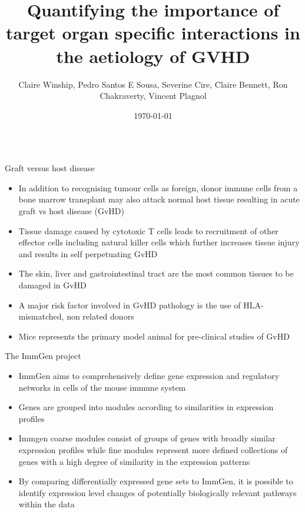 \documentclass[final,hyperref={pdfpagelabels=false}]{beamer}
\title[GVHD]{Quantifying the importance of target organ specific interactions in the aetiology of GVHD}
\author[Winship \& Plagnol]{Claire Winship, Pedro Santos E Sousa, Severine Cire, Claire Bennett, Ron Chakraverty, Vincent Plagnol}
\institute[UGI]{UCL Genetics Institute}
\date{\today}
\begin{document}
  \begin{frame}{} 

  \begin{beamercolorbox}{}
    \maketitle
  \end{beamercolorbox}


    \vfill
    \begin{columns}[t]

      \begin{column}{.26\linewidth}
        \begin{block}{Graft versus host disease}
    {\small  \begin{itemize}
          \item In addition to recognising tumour cells as foreign, donor immune cells from a bone marrow transplant may also attack normal host tissue resulting in acute graft vs host disease (GvHD)
	  \item Tissue damage caused by cytotoxic T cells leads to recruitment of other effector cells including natural killer cells which further increases tissue injury and results in self perpetuating GvHD
          \item The skin, liver and gastrointestinal tract are the most common tissues to be damaged in GvHD
	  \item A major risk factor involved in GvHD pathology is the use of HLA-mismatched, non related donors
          \item Mice represents the primary model animal for pre-clinical studies of GvHD
          \end{itemize}} 
        \end{block}

        \begin{block}{The ImmGen project}
     {\small     \begin{itemize}
          \item ImmGen aims to comprehensively define gene expression and regulatory networks in cells of the mouse immune system
          \item Genes are grouped into modules according to similarities in expression profiles 
          \item Immgen coarse modules consist of groups of genes with broadly similar expression profiles while fine modules represent more defined collections of genes with a high degree of similarity in the expression patterns
	  \item By comparing differentially expressed gene sets to ImmGen, it is possible to identify expression level changes of potentially biologically relevant pathways within the data
          \end{itemize}}
        \end{block}


\end{column}
\end{columns}
\end{frame}
\end{document}
